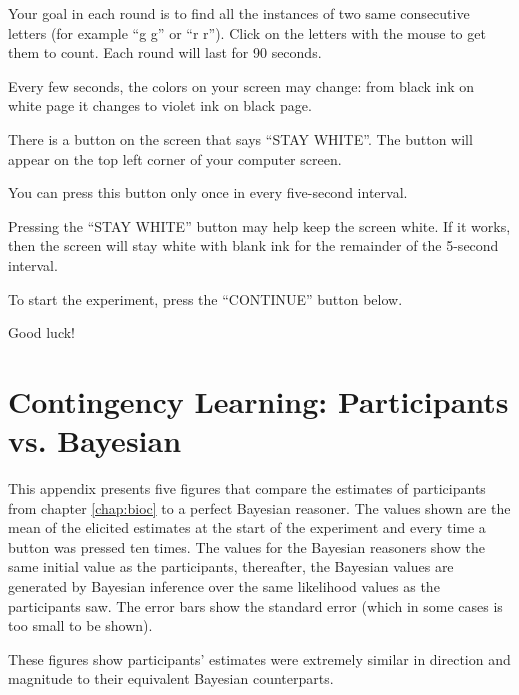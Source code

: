 \documentclass[USenglish,letterpaper,12pt,extrafontsizes,oneside,onecolumn,final]{memoir}
\begin{document}
Your goal in each round is to find all the instances of two same consecutive letters (for example ``g g'' or ``r r''). Click on the letters with the mouse to get them to count.  Each round will last for 90 seconds.

Every few seconds, the colors on your screen may change: from black ink on white page it changes to violet ink on black page. 

There is a button on the screen that says ``STAY WHITE''. The button will appear on the top left corner of your computer screen.  

You can press this button only once in every five-second interval.

Pressing the ``STAY WHITE'' button may help keep the screen white. If it works, then the screen will stay white with blank ink for the remainder of the 5-second interval.
 
To start the experiment, press the ``CONTINUE'' button below.

Good luck!

\clearpage

\chapter{Contingency Learning: Participants vs. Bayesian}
\label{app:bayesian}

This appendix presents five figures that compare the estimates of participants from chapter \ref{chap:bioc} to a perfect Bayesian reasoner.  The values shown are the mean of the elicited estimates at the start of the experiment and every time a button was pressed ten times.  The values for the Bayesian reasoners show the same initial value as the participants, thereafter, the Bayesian values are generated by Bayesian inference over the same likelihood values as the participants saw. The error bars show the standard error (which in some cases is too small to be shown). 

These figures show participants' estimates were extremely similar in direction and magnitude to their equivalent Bayesian counterparts.  
\end{document}
